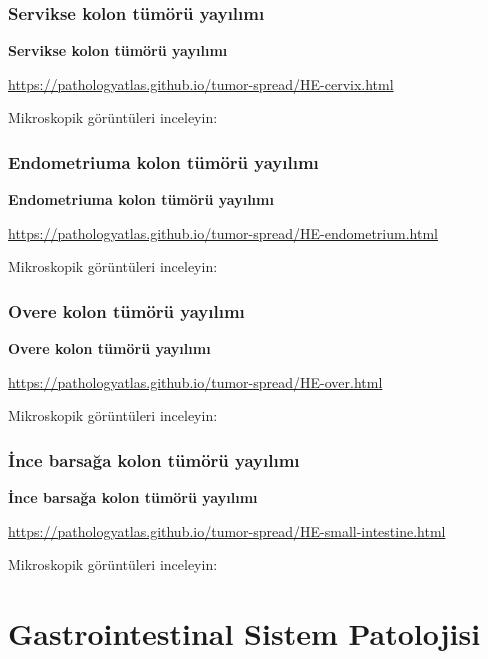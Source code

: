 \documentclass[
  letterpaper,
  DIV=11,
  numbers=noendperiod]{scrreprt}
\begin{document}
\hypertarget{servikse-kolon-tuxfcmuxf6ruxfc-yayux131lux131mux131}{%
\section{Servikse kolon tümörü
yayılımı}\label{servikse-kolon-tuxfcmuxf6ruxfc-yayux131lux131mux131}}

\textbf{Servikse kolon tümörü yayılımı}

\url{https://pathologyatlas.github.io/tumor-spread/HE-cervix.html}

Mikroskopik görüntüleri inceleyin:

\hypertarget{endometriuma-kolon-tuxfcmuxf6ruxfc-yayux131lux131mux131}{%
\section{Endometriuma kolon tümörü
yayılımı}\label{endometriuma-kolon-tuxfcmuxf6ruxfc-yayux131lux131mux131}}

\textbf{Endometriuma kolon tümörü yayılımı}

\url{https://pathologyatlas.github.io/tumor-spread/HE-endometrium.html}

Mikroskopik görüntüleri inceleyin:

\hypertarget{overe-kolon-tuxfcmuxf6ruxfc-yayux131lux131mux131}{%
\section{Overe kolon tümörü
yayılımı}\label{overe-kolon-tuxfcmuxf6ruxfc-yayux131lux131mux131}}

\textbf{Overe kolon tümörü yayılımı}

\url{https://pathologyatlas.github.io/tumor-spread/HE-over.html}

Mikroskopik görüntüleri inceleyin:

\hypertarget{ince-barsaux11fa-kolon-tuxfcmuxf6ruxfc-yayux131lux131mux131}{%
\section{İnce barsağa kolon tümörü
yayılımı}\label{ince-barsaux11fa-kolon-tuxfcmuxf6ruxfc-yayux131lux131mux131}}

\textbf{İnce barsağa kolon tümörü yayılımı}

\url{https://pathologyatlas.github.io/tumor-spread/HE-small-intestine.html}

Mikroskopik görüntüleri inceleyin:

\part{Gastrointestinal Sistem Patolojisi}
\end{document}

